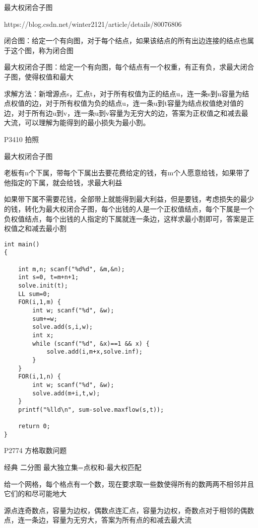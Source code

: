 最大权闭合子图

https://blog.csdn.net/winter2121/article/details/80076806

闭合图：给定一个有向图，对于每个结点，如果该结点的所有出边连接的结点也属于这个图，称为闭合图

最大权闭合子图：给定一个有向图，每个结点有一个权重，有正有负，求最大闭合子图，使得权值和最大

求解方法：新增源点s，汇点t，对于所有权值为正的结点u，连一条s到u容量为结点权值的边，对于所有权值为负的结点u，连一条u到t容量为结点权值绝对值的边，对于所有边u到v，连一条u到v容量为无穷大的边，答案为正权值之和减去最大流，可以理解为能得到的最小损失为最小割。

P3410 拍照

最大权闭合子图

老板有n个下属，带每个下属出去要花费给定的钱，有m个人愿意给钱，如果带了他指定的下属，就会给钱，求最大利益

如果带下属不需要花钱，全部带上就能得到最大利益，但是要钱，考虑损失的最少的钱，转化为最大权闭合子图，每个出钱的人是一个正权值结点，每个下属是一个负权值结点，每个出钱的人指定的下属就连一条边，这样求最小割即可，答案是正权值之和减去最小割

\begin{lstlisting}
int main()
{

    int m,n; scanf("%d%d", &m,&n);
    int s=0, t=m+n+1;
    solve.init(t);
    LL sum=0;
    FOR(i,1,m) {
        int w; scanf("%d", &w);
        sum+=w;
        solve.add(s,i,w);
        int x;
        while (scanf("%d", &x)==1 && x) {
            solve.add(i,m+x,solve.inf);
        }
    }
    FOR(i,1,n) {
        int w; scanf("%d", &w);
        solve.add(m+i,t,w);
    }
    printf("%lld\n", sum-solve.maxflow(s,t));

    return 0;
}
\end{lstlisting}

P2774 方格取数问题

经典 二分图 最大独立集=点权和-最大权匹配

给一个网格，每个格点有一个数，现在要求取一些数使得所有的数两两不相邻并且它们的和尽可能地大

源点连奇数点，容量为边权，偶数点连汇点，容量为边权，奇数点对于相邻的偶数点，连一条边，容量为无穷大，答案为所有点的和减去最大流

